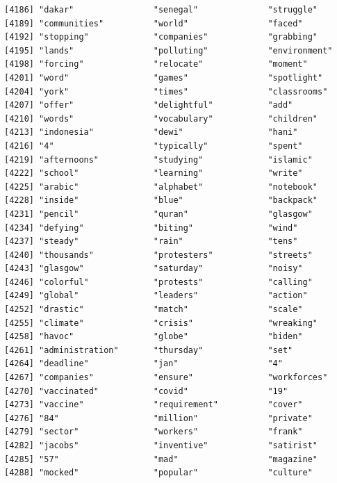 \documentclass[
  letterpaper,
  DIV=11,
  numbers=noendperiod]{scrartcl}
\begin{document}
\begin{verbatim}
[4186] "dakar"                "senegal"              "struggle"            
[4189] "communities"          "world"                "faced"               
[4192] "stopping"             "companies"            "grabbing"            
[4195] "lands"                "polluting"            "environment"         
[4198] "forcing"              "relocate"             "moment"              
[4201] "word"                 "games"                "spotlight"           
[4204] "york"                 "times"                "classrooms"          
[4207] "offer"                "delightful"           "add"                 
[4210] "words"                "vocabulary"           "children"            
[4213] "indonesia"            "dewi"                 "hani"                
[4216] "4"                    "typically"            "spent"               
[4219] "afternoons"           "studying"             "islamic"             
[4222] "school"               "learning"             "write"               
[4225] "arabic"               "alphabet"             "notebook"            
[4228] "inside"               "blue"                 "backpack"            
[4231] "pencil"               "quran"                "glasgow"             
[4234] "defying"              "biting"               "wind"                
[4237] "steady"               "rain"                 "tens"                
[4240] "thousands"            "protesters"           "streets"             
[4243] "glasgow"              "saturday"             "noisy"               
[4246] "colorful"             "protests"             "calling"             
[4249] "global"               "leaders"              "action"              
[4252] "drastic"              "match"                "scale"               
[4255] "climate"              "crisis"               "wreaking"            
[4258] "havoc"                "globe"                "biden"               
[4261] "administration"       "thursday"             "set"                 
[4264] "deadline"             "jan"                  "4"                   
[4267] "companies"            "ensure"               "workforces"          
[4270] "vaccinated"           "covid"                "19"                  
[4273] "vaccine"              "requirement"          "cover"               
[4276] "84"                   "million"              "private"             
[4279] "sector"               "workers"              "frank"               
[4282] "jacobs"               "inventive"            "satirist"            
[4285] "57"                   "mad"                  "magazine"            
[4288] "mocked"               "popular"              "culture"             

\end{verbatim}
\end{document}
